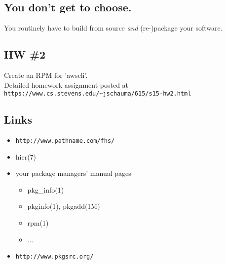 \documentclass[xga]{xdvislides}
\begin{document}
\subsection{You don't get to choose.}
\Huge
\vfill
\begin{center}
	You routinely have to build from source {\em and} (re-)package your software.
\end{center}
\vfill
\Normalsize

\subsection{HW \#2}

Create an RPM for 'awscli'.
\\

Detailed homework assignment posted at
\verb+https://www.cs.stevens.edu/~jschauma/615/s15-hw2.html+


\subsection{Links}
\begin{itemize}
	\item \verb+http://www.pathname.com/fhs/+
	\item hier(7)
	\item your package managers' manual pages
		\begin{itemize}
			\item pkg\_info(1)
			\item pkginfo(1), pkgadd(1M)
			\item rpm(1)
			\item ...
		\end{itemize}
	\item \verb+http://www.pkgsrc.org/+
\end{itemize}
\end{document}
